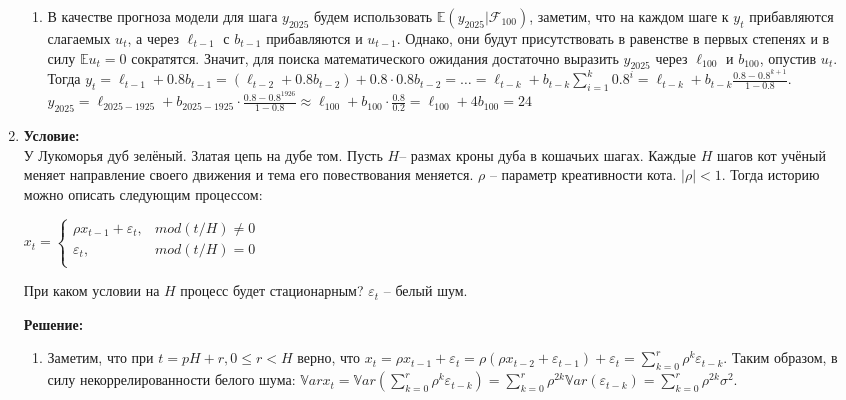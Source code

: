 \documentclass{article}
\begin{document}
\begin{enumerate}
\begin{enumerate}
    \item В качестве прогноза модели для шага $y_{2025}$ будем использовать $\mathbb{E}(y_{2025}|\mathcal{F}_100)$, заметим, что на каждом шаге к
    $y_t$ прибавляются слагаемых $u_t$, а через $\ell_{t-1}$ с $b_{t-1}$ прибавляются и $u_{t-1}$. Однако, они будут присутствовать в равенстве в первых
    степенях и в силу $\mathbb{E}u_t = 0$ сократятся. Значит, для поиска математического ожидания достаточно выразить $y_{2025}$ через $\ell_{100}$ и $b_{100}$,
    опустив $u_t$.\\
    Тогда $y_{t} = \ell_{t-1} + 0.8b_{t-1} = (\ell_{t-2} + 0.8b_{t-2}) + 0.8\cdot 0.8b_{t-2} = \hdots = \ell_{t-k} + b_{t-k}\sum\limits_{i=1}^k 0.8^i =
    \ell_{t-k} + b_{t-k} \frac{0.8 - 0.8^{k+1}}{1 - 0.8}$.
    $y_{2025} = \ell_{2025 - 1925} + b_{2025 - 1925}\cdot\frac{0.8 - 0.8^{1926}}{1 - 0.8} \approx \ell_{100} + b_{100} \cdot \frac{0.8}{0.2} = \ell_{100} + 4b_{100} = 24$
\end{enumerate}

\item \textbf{Условие:}\\
У Лукоморья дуб зелёный. Златая цепь на дубе том. Пусть $H$-- размах кроны дуба в кошачьих шагах.
Каждые $H$ шагов кот учёный меняет направление своего движения и тема его повествования меняется.
$\rho$ -- параметр креативности кота. $|\rho|<1$. Тогда историю можно описать следующим процессом:
\begin{center}
    \begin{math}
        x_t =
        \begin{cases}
            \rho x_{t-1} + \varepsilon_t, & mod(t/H) \not= 0 \\
            \varepsilon_t, & mod(t/H) = 0 \\
        \end{cases}
    \end{math}
\end{center}
При каком условии на $H$ процесс будет стационарным? $\varepsilon_t$ -- белый шум.

\textbf{Решение:}
\begin{enumerate}[label=(\arabic*)]
    \item Заметим, что при $t = pH + r, 0\leq r < H$ верно, что $x_t = \rho x_{t-1} + \varepsilon_t =
    \rho(\rho x_{t-2} + \varepsilon_{t-1}) + \varepsilon_t = \sum\limits_{k=0}^r \rho^k\varepsilon_{t-k}$.
    Таким образом, в силу некоррелированности белого шума: $\mathbb{V}ar x_t = \mathbb{V}ar(\sum\limits_{k=0}^r \rho^k\varepsilon_{t-k}) =
    \sum\limits_{k=0}^r\rho^{2k}\mathbb{V}ar(\varepsilon_{t-k}) = \sum\limits_{k=0}^r\rho^{2k}\sigma^2$.


\end{enumerate}
\end{enumerate}
\end{document}
